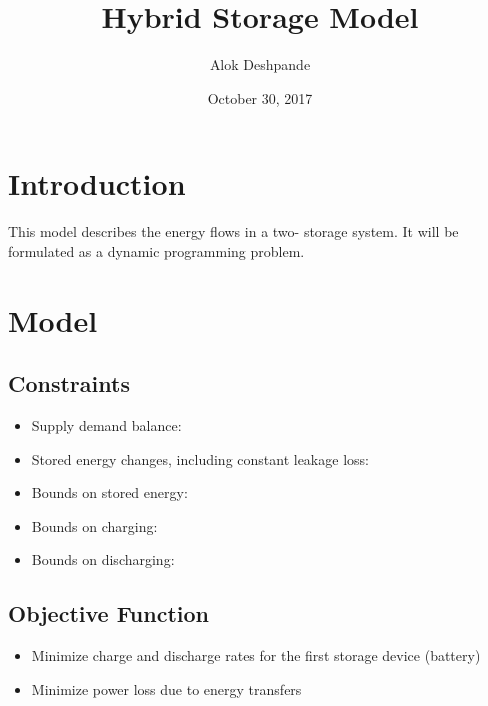 \documentclass{article}
\title{Hybrid Storage Model}
\author{Alok Deshpande}
\date{October 30, 2017}
\begin{document}
	
	\maketitle
	
	\section{Introduction}
	This model describes the energy flows in a two- storage system. It will be formulated as a dynamic programming problem.
	
		

	
	\section{Model}
	
	\subsection{Constraints}
	\begin{itemize}
		\item Supply demand balance: 
		\item Stored energy changes, including constant leakage loss:\\
		\item Bounds on stored energy: 
		\item Bounds on charging:
		\item Bounds on discharging:
	\end{itemize}

	\subsection{Objective Function}
	\begin{itemize}
		\item Minimize charge and discharge rates
		 for the first storage device (battery)
 		\item Minimize power loss due to energy transfers
	\end{itemize}
	
	
	
\end{document}
